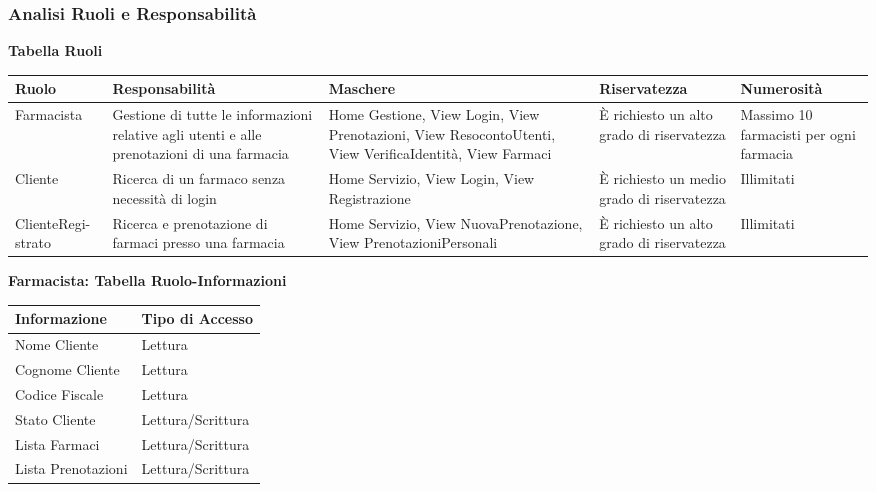 \newpage
\subsubsection{Analisi Ruoli e Responsabilità}
\hfill \break

\textbf{Tabella Ruoli}
\hfill \break

\begin{tabular} {|P{2.5cm}|P{3cm}|P{4cm}|P{3cm}|P{2.5cm}|}
    \hline
    \textbf{Ruolo} & \textbf{Responsabilità} & \textbf{Maschere} & \textbf{Riservatezza} & \textbf{Numerosità} \\
    \hline
    Farmacista & Gestione di tutte le informazioni relative agli utenti e alle
    prenotazioni di una farmacia & Home Gestione, View Login, View
    Prenotazioni, View ResocontoUtenti, View VerificaIdentità, View Farmaci  &
    È richiesto un alto grado di riservatezza  & Massimo 10 farmacisti per ogni
    farmacia \\
    \hline
    Cliente & Ricerca di un farmaco senza necessità di login & Home Servizio,
    View Login, View Registrazione  & È richiesto un medio grado di
    riservatezza & Illimitati \\
    \hline
    ClienteRegi-\linebreak strato & Ricerca e prenotazione di farmaci presso una farmacia
                        & Home Servizio, View NuovaPrenotazione, View
    PrenotazioniPersonali &  È richiesto un alto grado di riservatezza  &
    Illimitati \\
    \hline
\end{tabular}
\hfill \break
\hfill \break

\textbf{Farmacista: Tabella Ruolo-Informazioni}
\hfill \break

\begin{tabular} {|P{7cm}|P{7cm}|}
    \hline
    \textbf{Informazione} & \textbf{Tipo di Accesso} \\
    \hline
    Nome Cliente & Lettura \\
    \hline
    Cognome Cliente & Lettura \\
    \hline
    Codice Fiscale & Lettura \\
    \hline
    Stato Cliente & Lettura/Scrittura \\
    \hline
    Lista Farmaci & Lettura/Scrittura \\
    \hline
    Lista Prenotazioni & Lettura/Scrittura \\
    \hline
\end{tabular}
\hfill \break
\hfill \break


